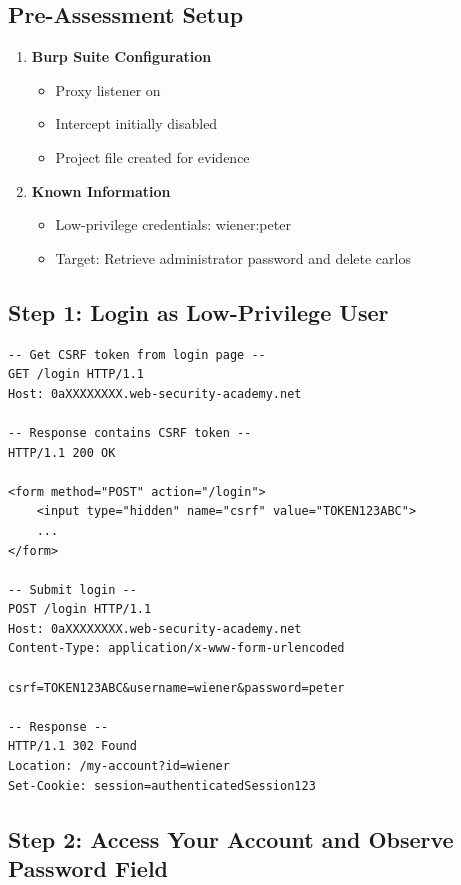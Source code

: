 \documentclass[11pt,letterpaper]{article}
\newcommand{\code}[1]{\texttt{\detokenize{#1}}}
\begin{document}
\subsection{Pre-Assessment Setup}

\begin{enumerate}
  \item \textbf{Burp Suite Configuration}
  \begin{itemize}
    \item Proxy listener on \code{127.0.0.1:8080}
    \item Intercept initially disabled
    \item Project file created for evidence
  \end{itemize}

  \item \textbf{Known Information}
  \begin{itemize}
    \item Low-privilege credentials: wiener:peter
    \item Target: Retrieve administrator password and delete carlos
  \end{itemize}
\end{enumerate}

\subsection{Step 1: Login as Low-Privilege User}

\begin{lstlisting}[language=http,caption={Step 1: Login with provided credentials}]
-- Get CSRF token from login page --
GET /login HTTP/1.1
Host: 0aXXXXXXXX.web-security-academy.net

-- Response contains CSRF token --
HTTP/1.1 200 OK

<form method="POST" action="/login">
    <input type="hidden" name="csrf" value="TOKEN123ABC">
    ...
</form>

-- Submit login --
POST /login HTTP/1.1
Host: 0aXXXXXXXX.web-security-academy.net
Content-Type: application/x-www-form-urlencoded

csrf=TOKEN123ABC&username=wiener&password=peter

-- Response --
HTTP/1.1 302 Found
Location: /my-account?id=wiener
Set-Cookie: session=authenticatedSession123
\end{lstlisting}

\subsection{Step 2: Access Your Account and Observe Password Field}
\end{document}
